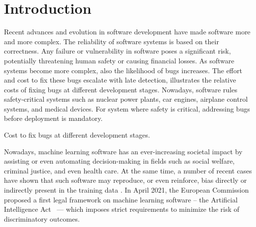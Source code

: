 \chapter{Introduction}

Recent advances and evolution in software development have made software more and more complex.
The reliability of software systems is based on their correctness.
Any failure or vulnerability in software poses a significant risk, potentially threatening human safety or causing financial losses.
As software systems become more complex, also the likelihood of bugs increases.
The effort and cost to fix these bugs escalate with late detection,  illustrates the relative costs of fixing bugs at different development stages.
Nowadays, software rules safety-critical systems such as nuclear power plants, car engines, airplane control systems, and medical devices.
For system where safety is critical, addressing bugs before deployment is mandatory.

\begin{margintable}[*1]
  \caption{Cost to fix bugs at different development stages.}
  \centering
\end{margintable}

Nowadays, machine learning software has an ever-increasing societal impact by assisting or even automating decision-making in fields such as social welfare, criminal justice, and even health care.
At the same time, a number of recent cases have shown that such software may reproduce, or even reinforce, bias directly or indirectly present in the training data .
In April 2021, the European Commission proposed a first legal framework on machine learning software -- the Artificial Intelligence Act~
--- which imposes strict requirements to minimize the risk of discriminatory outcomes.

